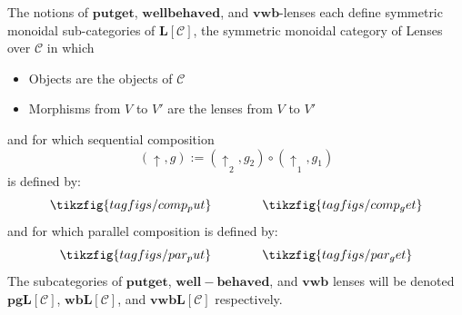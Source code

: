 \documentclass[a4paper,11pt]{article}
\newcommand{\putt}[1]{\mathbin{\uparrow_{#1}}}
\theoremstyle{definition}
\theoremstyle{plain}
\theoremstyle{plain}
\theoremstyle{definition}
\begin{document}
The notions of $\mathbf{putget}$, $\mathbf{well behaved}$, and $\mathbf{vwb}$-lenses each define symmetric monoidal sub-categories of $\mathbf{L}[\mathcal{C}]$, the symmetric monoidal category of Lenses over $\mathcal{C}$ in which
\begin{itemize}
    \item Objects are the objects of $\mathcal{C}$
    \item Morphisms from $V$ to $V'$ are the lenses from $V$ to $V'$
\end{itemize}
and for which sequential composition \[(\putt{},g):=(\putt{}_2,g_2) \circ (\putt{}_1,g_1)\] is defined by:
\[\tikzfig{tagfigs/comp_put} \quad \quad \quad \quad \tikzfig{tagfigs/comp_get}\]
and for which parallel composition is defined by:
\[\tikzfig{tagfigs/par_put} \quad \quad \quad \quad \tikzfig{tagfigs/par_get}\]
The subcategories of $\mathbf{putget}$, $\mathbf{well-behaved}$, and $\mathbf{vwb}$ lenses will be denoted $\mathbf{pgL}[\mathcal{C}]$, $\mathbf{wbL}[\mathcal{C}]$, and $\mathbf{vwbL}[\mathcal{C}]$ respectively.


\end{document}
